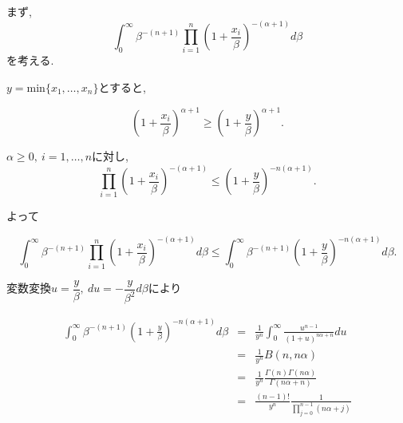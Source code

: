 \documentclass[12pt,dvipdfmx]{beamer}
\begin{document}
\begin{frame}

まず, 
\begin{equation}
\int_{0}^{\infty}\beta ^{-(n+1)}\prod_{i=1}^{n}\left(1+\frac{x_{i}}{\beta }\right)
^{-(\alpha +1)}d\beta 
\end{equation}
を考える. 
 
$y=\mbox{min}\{x_{1},\ldots,x_{n}\}$とすると, 

$$
\left(1+\frac{x_{i}}{\beta }\right)^{\alpha +1}
\geq
\left(1+\frac{y}{\beta }\right)^{\alpha +1}.
$$

\end{frame}




\begin{frame}


$\alpha \geq 0,~i=1,\ldots,n$に対し, 
$$
\prod_{i=1}^{n}\left(1+\frac{x_{i}}{\beta }\right)^{-(\alpha +1)}
\leq
\left(1+\frac{y}{\beta }\right)^{-n(\alpha +1)}.
$$

よって

$$
\int_{0}^{\infty}\beta ^{-(n+1)}\prod_{i=1}^{n}
\left(1+\frac{x_{i}}{\beta }\right)^{-(\alpha +1)}d\beta 
\leq
\int_{0}^{\infty}\beta ^{-(n+1)}
\left(1+\frac{y}{\beta }\right)^{-n(\alpha +1)}d\beta .
$$

\end{frame}



\begin{frame}



変数変換$u=\dfrac{y}{\beta },~du=-\dfrac{y}{\beta ^{2}}d\beta $により

\begin{eqnarray*}
\int_{0}^{\infty}\beta ^{-(n+1)}
\left(1+\frac{y}{\beta }\right)^{-n(\alpha +1)}d\beta 
&=&
\frac{1}{y^{n}}\int_{0}^{\infty}\frac{u^{n-1}}{(1+u)^{n\alpha +n}}du \\
&=&
\frac{1}{y^{n}}B(n,n\alpha) \\
&=&
\frac{1}{y^{n}}\frac{\Gamma (n)\Gamma(n\alpha )}{\Gamma (n\alpha +n)} \\
&=&
\frac{(n-1)!}{y^{n}}\frac{1}{\prod_{j=0}^{n-1}(n\alpha +j)}
\end{eqnarray*}


\end{frame}
\end{document}
